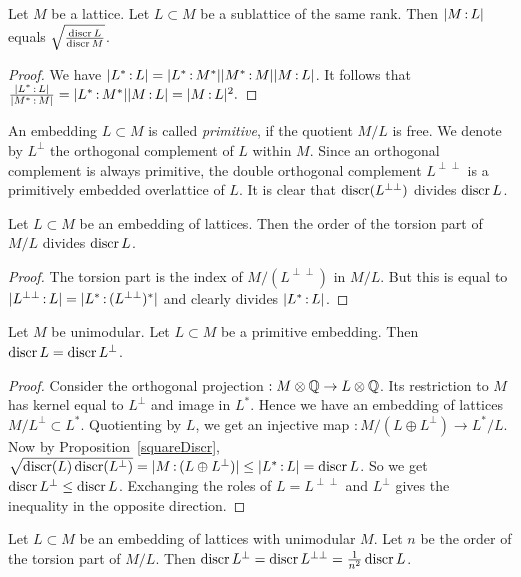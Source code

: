 \begin{proposition} \label{squareDiscr}Let $M$ be a lattice. Let $L\subset M$ be a sublattice of the same rank. Then $|M\,{:}\, L|$ equals $\sqrt{\frac{\operatorname{discr} L}{\operatorname{discr} M}}$.
\end{proposition}
\begin{proof}
We have $|L^*\,{:}\, L|=\allowbreak |L^*\,{:}\, M^*||M^*\,{:}\, M||M\,{:}\, L|$. It follows that
$\frac{|L^*\,{:}\, L|}{|M^*\,{:}\, M|}=\allowbreak |L^*\,{:}\, M^*||M\,{:}\, L|=\allowbreak |M\,{:}\, L|^2.$
\end{proof}
An embedding $L\subset M$ is called \emph{primitive}, if the quotient $M/L$ is free. We denote by $L^\perp$ the orthogonal complement of $L$ within $M$. Since an orthogonal complement is always primitive, the double orthogonal complement $ L^{\perp\perp}$ is a primitively embedded overlattice of $L$. It is clear that $\operatorname{discr}( L^{\perp\perp})$ divides $\operatorname{discr} L$. 
\begin{proposition}\label{TorsionQuotient} Let $L\subset M$ be an embedding of lattices. Then the order of the torsion part of $M/L$ 
divides $\operatorname{discr} L$.
\end{proposition}
\begin{proof}
The torsion part is the index of $M/( L^{\perp\perp})$ in $M/L$. But this is equal to $|L^{\perp\perp}\,{:}\, L| = |L^* \,{:}\, (L^{\perp\perp})^*|$ and clearly divides $|L^*\,{:}\, L|$.
\end{proof}
\begin{proposition}\label{discrOrthPrim}
Let $M$ be unimodular. Let $L\subset M$ be a primitive embedding. Then $\operatorname{discr} L = \operatorname{discr} L^\perp$.
\end{proposition}
\begin{proof}
Consider the orthogonal projection $ : M\otimes\mathbb{Q} \rightarrow L\otimes \mathbb{Q}$. Its restriction to $M$ has kernel equal to $L^\perp$ and image in $L^*$. Hence we have an embedding of lattices $M/L^\perp \subset L^*$. Quotienting by $L$, we get an injective map $: M/(L\oplus L^\perp) \rightarrow L^*/L$. 
Now by Proposition~\ref{squareDiscr}, $\sqrt{\operatorname{discr}(L) \operatorname{discr} (L^\perp)} =|M \,{:}\, (L\oplus L^\perp)| \leq |L^*\,{:}\, L| = \operatorname{discr} L$. So we get $\operatorname{discr} L^\perp \leq \operatorname{discr} L$. Exchanging the roles of $L=L^{\perp\perp}$ and $L^\perp$ gives the inequality in the opposite direction.
\end{proof}
\begin{corollary}\label{latticeCor}
Let $L\subset M$ be an embedding of lattices with unimodular $M$. Let $n$ be the order of the torsion part of $M/L$. Then $\operatorname{discr} L^\perp =\operatorname{discr} L^{\perp\perp} = \frac{1}{n^2}\operatorname{discr} L$.
\end{corollary}

